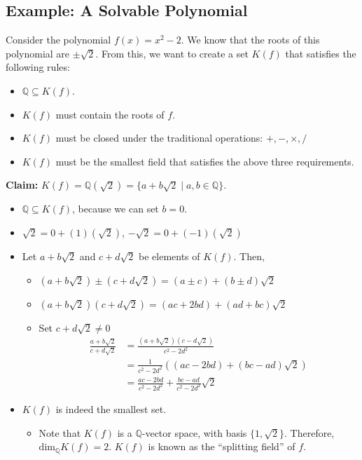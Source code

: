 \documentclass[10pt]{extarticle}
\newcommand{\Q}{\mathbb{Q}}
\begin{document}
  \subsection{Example: A Solvable Polynomial}%
  Consider the polynomial $f(x) = x^2 - 2$. We know that the roots of this polynomial are $\pm \sqrt{2}$. From this, we want to create a set $K(f)$ that satisfies the following rules:
  \begin{itemize}
    \item $\Q \subseteq K(f)$.
    \item $K(f)$ must contain the roots of $f$.
    \item $K(f)$ must be closed under the traditional operations: $+,-,\times,/$
    \item $K(f)$ must be the smallest field that satisfies the above three requirements.
  \end{itemize}
  \textbf{Claim:} $K(f) = \Q(\sqrt{2}) = \{a + b\sqrt{2}\mid a,b\in \Q\}$.
  \begin{itemize}
    \item $\Q\subseteq K(f)$, because we can set $b=0$.
    \item $\sqrt{2} = 0 + (1)(\sqrt{2})$, $-\sqrt{2} = 0 + (-1)(\sqrt{2})$
    \item Let $a+b\sqrt{2}$ and $c+d\sqrt{2}$ be elements of $K(f)$. Then,
      \begin{itemize}
        \item $(a+b\sqrt{2})\pm (c+d\sqrt{2}) = (a\pm c) + (b\pm d)\sqrt{2}$
        \item $(a+b\sqrt{2})(c+d\sqrt{2}) = (ac + 2bd) + (ad + bc)\sqrt{2}$
        \item Set $c+d\sqrt{2} \neq 0$
          \begin{align*}
            \frac{a+b\sqrt{2}}{c+d\sqrt{2}} &= \frac{(a+b\sqrt{2})(c-d\sqrt{2})}{c^2-2d^2}\\
                                            &= \frac{1}{c^2-2d^2}\left((ac-2bd) + (bc-ad)\sqrt{2}\right)\\
                                            &= \frac{ac-2bd}{c^2-2d^2} + \frac{bc-ad}{c^2-2d^2}\sqrt{2}
          \end{align*}
      \end{itemize}
    \item $K(f)$ is indeed the smallest set.
      \begin{itemize}
        \item Note that $K(f)$ is a $\Q$-vector space, with basis $\{1,\sqrt{2}\}$. Therefore, $\text{dim}_{\Q} K(f) = 2$. $K(f)$ is known as the ``splitting field'' of $f$.
      \end{itemize}
  \end{itemize}
\end{document}
